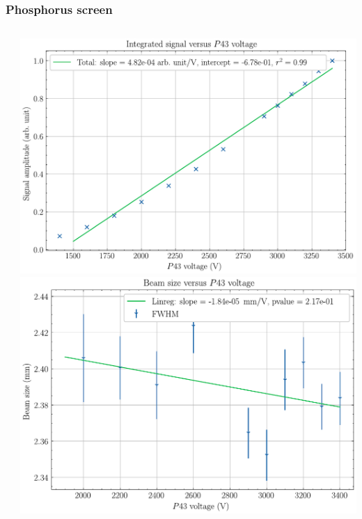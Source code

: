 \begin{frame}
  \frametitle{Phosphorus screen}
  \begin{columns}[T]
    \begin{column}{0.45\textwidth}
      \begin{block}{}
      \end{block}
    \end{column}
    \begin{column}{0.45\textwidth}
      \includegraphics[width=1\textwidth]{04_Test/fig/fig000_P43_gain}
      \includegraphics[width=1\textwidth]{04_Test/fig/fig000_P43_size}
    \end{column}
  \end{columns}
\end{frame}

